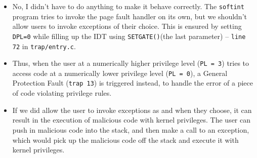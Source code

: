 \documentclass[]{article}
\begin{document}
\begin{itemize}
\itemsep1pt\parskip0pt
\item
  No, I didn't have to do anything to make it behave correctly. The
  \texttt{softint} program tries to invoke the page fault handler on its
  own, but we shouldn't allow users to invoke exceptions of their
  choice. This is ensured by setting \texttt{DPL=0} while filling up the
  IDT using \texttt{SETGATE()}(the last parameter) -- \texttt{line 72}
  in \texttt{trap/entry.c}.
\item
  Thus, when the user at a numerically higher privilege level
  (\texttt{PL = 3}) tries to access code at a numerically lower
  privilege level (\texttt{PL = 0}), a General Protection Fault
  (\texttt{trap 13}) is triggered instead, to handle the error of a
  piece of code violating privilege rules.
\item
  If we did allow the user to invoke exceptions as and when they choose,
  it can result in the execution of malicious code with kernel
  privileges. The user can push in malicious code into the stack, and
  then make a call to an exception, which would pick up the malicious
  code off the stack and execute it with kernel privileges.
\end{itemize}
\end{document}
